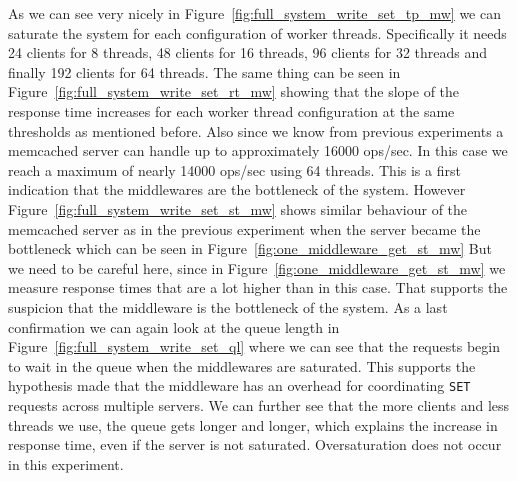 \documentclass[11pt,a4paper]{article}
\begin{document}
%
As we can see very nicely in Figure~\ref{fig:full_system_write_set_tp_mw} we can saturate the system for each configuration of worker threads.
%
Specifically it needs 24 clients for 8 threads, 48 clients for 16 threads, 96 clients for 32 threads and finally 192 clients for 64 threads.
%
The same thing can be seen in Figure~\ref{fig:full_system_write_set_rt_mw} showing that the slope of the response time increases for each worker thread configuration at the same thresholds as mentioned before.
%
Also since we know from previous experiments a memcached server can handle up to approximately 16000 ops/sec.
%
In this case we reach a maximum of nearly 14000 ops/sec using 64 threads.
%
This is a first indication that the middlewares are the bottleneck of the system.
%
However Figure~\ref{fig:full_system_write_set_st_mw} shows similar behaviour of the memcached server as in the previous experiment when the server became the bottleneck which can be seen in Figure~\ref{fig:one_middleware_get_st_mw}
%
But we need to be careful here, since in Figure~\ref{fig:one_middleware_get_st_mw} we measure response times that are a lot higher than in this case.
%
That supports the suspicion that the middleware is the bottleneck of the system.
%
As a last confirmation we can again look at the queue length in Figure~\ref{fig:full_system_write_set_ql} where we can see that the requests begin to wait in the queue when the middlewares are saturated.
%
This supports the hypothesis made that the middleware has an overhead for coordinating \texttt{SET} requests across multiple servers.
%
We can further see that the more clients and less threads we use, the queue gets longer and longer, which explains the increase in response time, even if the server is not saturated.
%
Oversaturation does not occur in this experiment.
%
\end{document}
